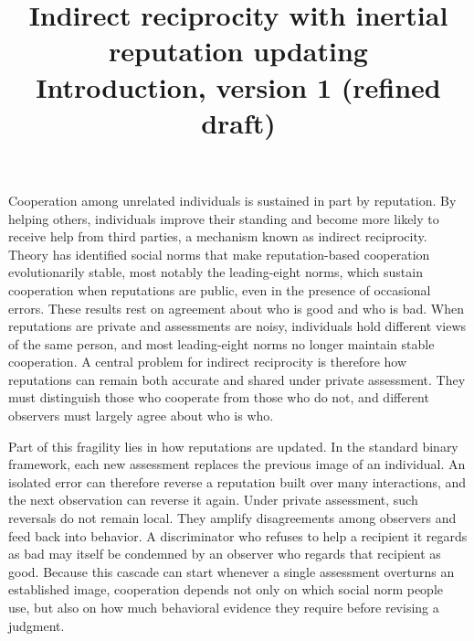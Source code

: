 \documentclass[11pt]{article}
\title{\large Indirect reciprocity with inertial reputation updating\\[0.3em]
\normalsize Introduction, version 1 (refined draft)}
\date{}
\begin{document}
\maketitle

Cooperation among unrelated individuals is sustained in part by reputation\cite{milinski2016,nowak2005}. By helping others, individuals improve their standing and become more likely to receive help from third parties, a mechanism known as indirect reciprocity\cite{nowak1998,leimar2001,wedekind2000,milinski2002}. Theory has identified social norms that make reputation-based cooperation evolutionarily stable\cite{panchanathan2003,ohtsuki2004}, most notably the leading-eight norms, which sustain cooperation when reputations are public, even in the presence of occasional errors\cite{ohtsuki2004,ohtsuki2006}. These results rest on agreement about who is good and who is bad. When reputations are private and assessments are noisy, individuals hold different views of the same person\cite{takahashi2006,uchida2010}, and most leading-eight norms no longer maintain stable cooperation\cite{hilbe2018,okada2018,perret2021,fujimoto2023}. A central problem for indirect reciprocity is therefore how reputations can remain both accurate and shared under private assessment. They must distinguish those who cooperate from those who do not, and different observers must largely agree about who is who\cite{fujimoto2022,murase2024synchronization}.

Part of this fragility lies in how reputations are updated. In the standard binary framework, each new assessment replaces the previous image of an individual\cite{ohtsuki2004,hilbe2018}. An isolated error can therefore reverse a reputation built over many interactions, and the next observation can reverse it again. Under private assessment, such reversals do not remain local. They amplify disagreements among observers and feed back into behavior. A discriminator who refuses to help a recipient it regards as bad may itself be condemned by an observer who regards that recipient as good\cite{hilbe2018,radzvilavicius2019,okada2020}. Because this cascade can start whenever a single assessment overturns an established image, cooperation depends not only on which social norm people use, but also on how much behavioral evidence they require before revising a judgment.
\end{document}
